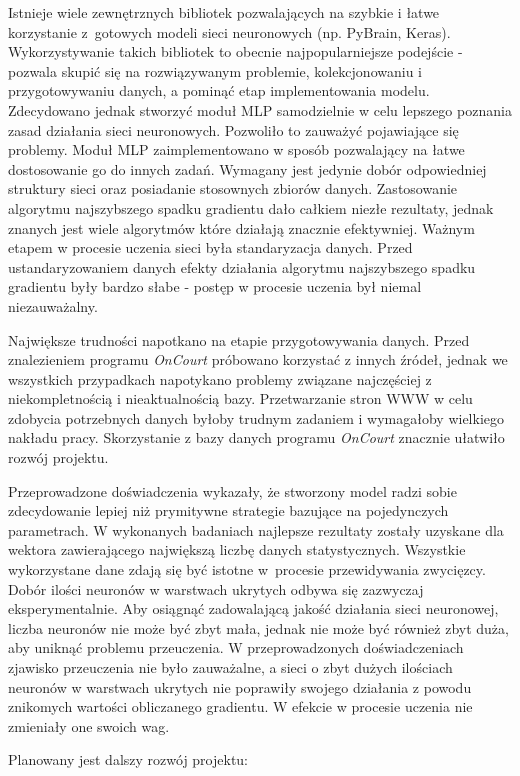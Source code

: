 Istnieje wiele zewnętrznych bibliotek pozwalających na szybkie i łatwe korzystanie z~gotowych modeli sieci neuronowych (np. PyBrain, Keras). Wykorzystywanie takich bibliotek to obecnie najpopularniejsze podejście - pozwala skupić się na rozwiązywanym problemie, kolekcjonowaniu i przygotowywaniu danych, a pominąć etap implementowania modelu. Zdecydowano jednak stworzyć moduł MLP samodzielnie w celu lepszego poznania zasad działania sieci neuronowych. Pozwoliło to zauważyć pojawiające się problemy. Moduł MLP zaimplementowano w sposób pozwalający na łatwe dostosowanie go do innych zadań. Wymagany jest jedynie dobór odpowiedniej struktury sieci oraz posiadanie stosownych zbiorów danych. Zastosowanie algorytmu najszybszego spadku gradientu dało całkiem niezłe rezultaty, jednak znanych jest wiele algorytmów które działają znacznie efektywniej. Ważnym etapem w procesie uczenia sieci była standaryzacja danych. Przed ustandaryzowaniem danych efekty działania algorytmu najszybszego spadku gradientu były bardzo słabe - postęp w procesie uczenia był niemal niezauważalny. 

Największe trudności napotkano na etapie przygotowywania danych. Przed znalezieniem programu \textit{OnCourt} próbowano korzystać z innych źródeł, jednak we wszystkich przypadkach napotykano problemy związane najczęściej z niekompletnością i nieaktualnością bazy. Przetwarzanie stron WWW w celu zdobycia potrzebnych danych byłoby trudnym zadaniem i wymagałoby wielkiego nakładu pracy. Skorzystanie z bazy danych programu \textit{OnCourt} znacznie ułatwiło rozwój projektu.

Przeprowadzone doświadczenia wykazały, że stworzony model radzi sobie zdecydowanie lepiej niż prymitywne strategie bazujące na pojedynczych parametrach. W wykonanych badaniach najlepsze rezultaty zostały uzyskane dla wektora zawierającego największą liczbę danych statystycznych. Wszystkie wykorzystane dane zdają się być istotne w~procesie przewidywania zwycięzcy. Dobór ilości neuronów w warstwach ukrytych odbywa się zazwyczaj eksperymentalnie. Aby osiągnąć zadowalającą jakość działania sieci neuronowej, liczba neuronów nie może być zbyt mała, jednak nie może być również zbyt duża, aby uniknąć problemu przeuczenia. W przeprowadzonych doświadczeniach zjawisko przeuczenia nie było zauważalne, a sieci o zbyt dużych ilościach neuronów w warstwach ukrytych nie poprawiły swojego działania z powodu znikomych wartości obliczanego gradientu. W efekcie w procesie uczenia nie zmieniały one swoich wag.

Planowany jest dalszy rozwój projektu:


